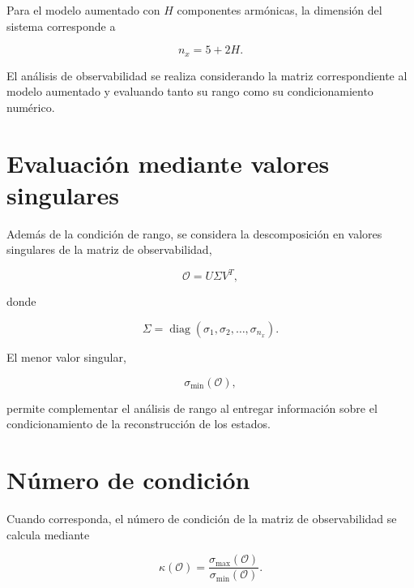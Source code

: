 Para el modelo aumentado con $H$ componentes armónicas, la dimensión
del sistema corresponde a

\begin{equation}
    n_x = 5 + 2H.
\end{equation}

El análisis de observabilidad se realiza considerando la matriz
correspondiente al modelo aumentado y evaluando tanto su rango como
su condicionamiento numérico.



\section{Evaluación mediante valores singulares}
\label{anexo:valores_singulares}

Además de la condición de rango, se considera la descomposición en
valores singulares de la matriz de observabilidad,

\begin{equation}
    \mathcal{O}
    =
    U\Sigma V^{T},
\end{equation}

donde

\begin{equation}
    \Sigma =
    \operatorname{diag}
    \left(
        \sigma_1,
        \sigma_2,
        \ldots,
        \sigma_{n_x}
    \right).
\end{equation}

El menor valor singular,

\begin{equation}
    \sigma_{\min}(\mathcal{O}),
\end{equation}

permite complementar el análisis de rango al entregar información
sobre el condicionamiento de la reconstrucción de los estados.


\section{Número de condición}
\label{anexo:condicion_observabilidad}

Cuando corresponda, el número de condición de la matriz de
observabilidad se calcula mediante

\begin{equation}
    \kappa(\mathcal{O})
    =
    \frac{\sigma_{\max}(\mathcal{O})}
         {\sigma_{\min}(\mathcal{O})}.
\end{equation}

